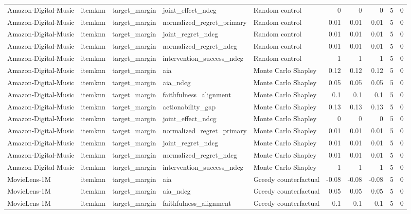 \begin{table}[t]
{\begin{tabular}{lllllrrrrr}
Amazon-Digital-Music & itemknn & target\_margin & joint\_effect\_ndcg & Random control & 0 & 0 & 0 & 5 & 0 \\
Amazon-Digital-Music & itemknn & target\_margin & normalized\_regret\_primary & Random control & 0.01 & 0.01 & 0.01 & 5 & 0 \\
Amazon-Digital-Music & itemknn & target\_margin & joint\_regret\_ndcg & Random control & 0.01 & 0.01 & 0.01 & 5 & 0 \\
Amazon-Digital-Music & itemknn & target\_margin & normalized\_regret\_ndcg & Random control & 0.01 & 0.01 & 0.01 & 5 & 0 \\
Amazon-Digital-Music & itemknn & target\_margin & intervention\_success\_ndcg & Random control & 1 & 1 & 1 & 5 & 0 \\
Amazon-Digital-Music & itemknn & target\_margin & aia & Monte Carlo Shapley & 0.12 & 0.12 & 0.12 & 5 & 0 \\
Amazon-Digital-Music & itemknn & target\_margin & aia\_ndcg & Monte Carlo Shapley & 0.05 & 0.05 & 0.05 & 5 & 0 \\
Amazon-Digital-Music & itemknn & target\_margin & faithfulness\_alignment & Monte Carlo Shapley & 0.1 & 0.1 & 0.1 & 5 & 0 \\
Amazon-Digital-Music & itemknn & target\_margin & actionability\_gap & Monte Carlo Shapley & 0.13 & 0.13 & 0.13 & 5 & 0 \\
Amazon-Digital-Music & itemknn & target\_margin & joint\_effect\_ndcg & Monte Carlo Shapley & 0 & 0 & 0 & 5 & 0 \\
Amazon-Digital-Music & itemknn & target\_margin & normalized\_regret\_primary & Monte Carlo Shapley & 0.01 & 0.01 & 0.01 & 5 & 0 \\
Amazon-Digital-Music & itemknn & target\_margin & joint\_regret\_ndcg & Monte Carlo Shapley & 0.01 & 0.01 & 0.01 & 5 & 0 \\
Amazon-Digital-Music & itemknn & target\_margin & normalized\_regret\_ndcg & Monte Carlo Shapley & 0.01 & 0.01 & 0.01 & 5 & 0 \\
Amazon-Digital-Music & itemknn & target\_margin & intervention\_success\_ndcg & Monte Carlo Shapley & 1 & 1 & 1 & 5 & 0 \\
MovieLens-1M & itemknn & target\_margin & aia & Greedy counterfactual & -0.08 & -0.08 & -0.08 & 5 & 0 \\
MovieLens-1M & itemknn & target\_margin & aia\_ndcg & Greedy counterfactual & 0.05 & 0.05 & 0.05 & 5 & 0 \\
MovieLens-1M & itemknn & target\_margin & faithfulness\_alignment & Greedy counterfactual & 0.1 & 0.1 & 0.1 & 5 & 0 \\

\end{tabular}}
\end{table}
